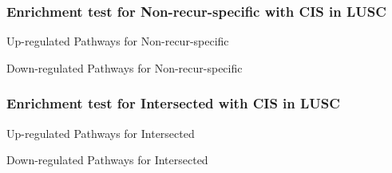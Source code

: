 \documentclass{beamer}
\begin{document}
    \begin{frame}
        \frametitle{Enrichment test for Non-recur-specific with CIS in LUSC}

        \begin{table}
            \caption{Up-regulated Pathways for Non-recur-specific}
            \resizebox{\linewidth}{!}
            {}
        \end{table}

        \begin{table}
            \caption{Down-regulated Pathways for Non-recur-specific}
            \resizebox{\linewidth}{!}
            {}
        \end{table}
    \end{frame}

    \begin{frame}
        \frametitle{Enrichment test for Intersected with CIS in LUSC}

        \begin{table}
            \caption{Up-regulated Pathways for Intersected}
            \resizebox{\linewidth}{!}
            {}
        \end{table}

        \begin{table}
            \caption{Down-regulated Pathways for Intersected}
            \resizebox{\linewidth}{!}
            {}
        \end{table}
    \end{frame}
\end{document}
